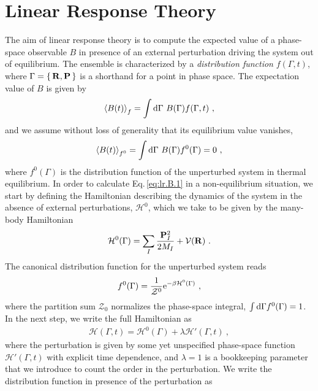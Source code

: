 \section{Linear Response Theory}
The aim of linear response theory is to compute the expected value of a phase-space observable $B$ in presence of an external perturbation driving the system out of equilibrium. The ensemble is characterized by a \emph{distribution function} $f(\Gamma, t)$, where $\Gamma = \set{{\bf R}, {\bf P}}$ is a shorthand for a point in phase space. The expectation value of $B$ is given by
\begin{align}
  \braket{B (t)}_{f}
    = \int \d \Gamma ~ B (\Gamma) f(\Gamma, t)~,
  \label{eq:lr.B.1}
\end{align}
and we assume without loss of generality that its equilibrium value vanishes,
\begin{align}
\braket{B (t)}_{f^0}
= \int \d \Gamma ~ B (\Gamma) f^0(\Gamma) = 0~,
\label{eq:lr.B0}
\end{align}
where $f^0 (\Gamma)$ is the distribution function of the unperturbed system in thermal equilibrium. In order to calculate Eq.\,\eqref{eq:lr.B.1} in a non-equilibrium situation, we start by defining the Hamiltonian describing the dynamics of the system in the absence of external perturbations, $\mathcal H^0$, which we take to be given by the many-body Hamiltonian
\begin{align}
  \mathcal H^0 (\Gamma) 
    = \sum_I \frac{\b P_I^2}{2 M_I} + \mathcal V (\b R)~.
  \label{eq:lr.H0}
\end{align}
The canonical distribution function for the unperturbed system reads
\begin{align}
f^0 (\Gamma) 
= \frac{1}{\mathcal{Z}^0} {\rm e}^{- \beta \mathcal H^0 (\Gamma)}~,
\label{eq:lr.f0}
\end{align}
where the partition sum $\mathcal{Z}_0$ normalizes the phase-space integral, \mbox{$\int {\rm d} \Gamma f^0 (\Gamma) = 1$}.
In the next step, we write the full Hamiltonian as
\begin{align}
  \mathcal H (\Gamma, t)
   = \mathcal H^0 (\Gamma) + \lambda \mathcal H' (\Gamma, t)~,
  \label{eq:lr.H}
\end{align}
where the perturbation is given by some yet unspecified phase-space function $\mathcal H' (\Gamma, t)$ with explicit time dependence, and $\lambda = 1$ is a bookkeeping parameter that we introduce to count the order in the perturbation.
We write the distribution function in presence of the perturbation as
